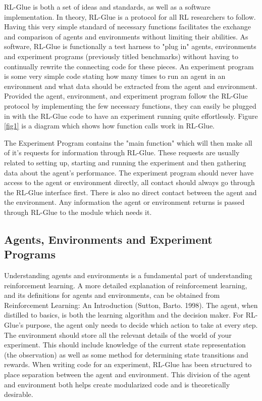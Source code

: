 \documentclass[11pt]{article}
\begin{document}
RL-Glue is both a set of ideas and standards, as well as a software implementation. In theory, RL-Glue is a protocol for all RL researchers to follow. Having this very simple standard of necessary functions facilitates the exchange and comparison of agents and environments without limiting their abilities. As software, RL-Glue is functionally a test harness to "plug in" agents, environments and experiment programs (previously titled benchmarks) without having to continually rewrite the connecting code for these pieces. An experiment program is some very simple code stating how many times to run an agent in an environment and what data should be extracted from the agent and environment. Provided the agent, environment, and experiment program follow the RL-Glue protocol by implementing the few necessary functions, they can easily be plugged in with the RL-Glue code to have an experiment running quite effortlessly. Figure \ref{fig1} is a diagram which shows how function calls work in RL-Glue.



The Experiment Program contains the "main function" which will then make all of it's requests for information through RL-Glue. These requests are usually related to setting up, starting and running the experiment and then gathering data about the agent's performance. The experiment program should never have access to the agent or environment directly, all contact should always go through the RL-Glue interface first.  There is also no direct contact between the agent and the environment. Any information the agent or environment returns is passed through RL-Glue to the module which needs it.  



\subsection{Agents, Environments and Experiment Programs}
Understanding agents and environments is a fundamental part of understanding reinforcement learning. A more detailed explanation of reinforcement learning, and its definitions for agents and environments, can be obtained from Reinforcement Learning: An Introduction (Sutton, Barto. 1998).  The agent, when distilled to basics, is both the learning algorithm and the decision maker. For RL-Glue's purpose, the agent only needs to decide which action to take at every step. The environment should store all the relevant details of the world of your experiment. This should include knowledge of the current state representation (the observation) as well as some method for determining state transitions and rewards. When writing code for an experiment, RL-Glue has been structured to place separation between the agent and environment. This division of the agent and environment both helps create modularized code and is theoretically desirable.
\end{document}
